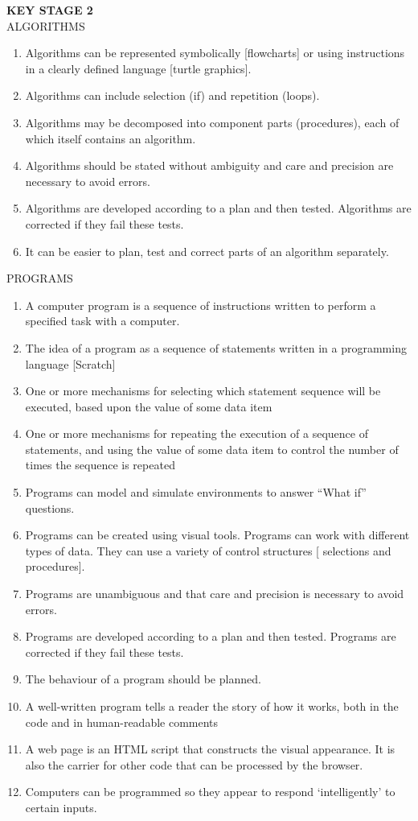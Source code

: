 \textbf{KEY STAGE 2}\\
ALGORITHMS
\begin{enumerate}
\item Algorithms can be represented symbolically [flowcharts] or using instructions in a
clearly defined language [turtle graphics].
\item Algorithms can include selection (if) and repetition (loops).
\item Algorithms may be decomposed into component parts (procedures), each of which
itself contains an algorithm.
\item Algorithms should be stated without ambiguity and care and precision are necessary
to avoid errors.
\item Algorithms are developed according to a plan and then tested. Algorithms are
corrected if they fail these tests.
\item It can be easier to plan, test and correct parts of an algorithm separately.
\end{enumerate}

PROGRAMS
\begin{enumerate}
\item A computer program is a sequence of instructions written to perform a specified task
with a computer.
\item The idea of a program as a sequence of statements written in a programming
language [Scratch]
\item One or more mechanisms for selecting which statement sequence will be executed,
based upon the value of some data item
\item One or more mechanisms for repeating the execution of a sequence of statements,
and using the value of some data item to control the number of times the sequence
is repeated
\item Programs can model and simulate environments to answer “What if” questions. 
\item Programs can be created using visual tools. Programs can work with different types
of data. They can use a variety of control structures [ selections and procedures].
\item Programs are unambiguous and that care and precision is necessary to avoid errors.
\item Programs are developed according to a plan and then tested. Programs are
corrected if they fail these tests.
\item The behaviour of a program should be planned.
\item A well-written program tells a reader the story of how it works, both in the code and
in human-readable comments
\item A web page is an HTML script that constructs the visual appearance. It is also the
carrier for other code that can be processed by the browser.
\item Computers can be programmed so they appear to respond ‘intelligently’ to certain
inputs.
\end{enumerate}

